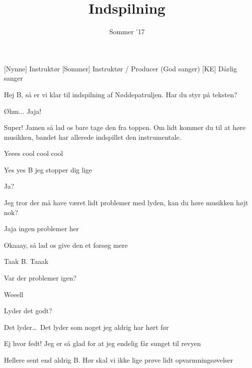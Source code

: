 \documentclass[a4paper,11pt]{article}
\title{Indspilning}
\author{Sommer '17}
\begin{document}
\maketitle

\begin{roles}
[Nynne] Instruktør
[Sommer] Instruktør / Producer (God sanger)
[KE] Dårlig sanger
\end{roles}

\begin{sketch}

 Hej B, så er vi klar til indspilning af Nøddepatruljen. Har du styr på teksten?


 Øhm... Jaja!

 Super! Jamen så lad os bare tage den fra toppen. Om lidt kommer du til at høre musikken, bandet har allerede indspillet den instrumentale.

 Yeees cool cool cool


 Yes yes B jeg stopper dig lige

 Ja?

 Jeg tror der må have været lidt problemer med lyden, kan du høre musikken højt nok?

 Jaja ingen problemer her


 Okaaay, så lad os give den et forsøg mere


 Taak B. Taaak

 Var der problemer igen?

 Weeell

 Lyder det godt?

 Det lyder\ldots\ Det lyder som noget jeg aldrig har hørt før

  Ej hvor fedt! Jeg er så glad for at jeg endelig får sunget til revyen

  Hellere sent end aldrig B. Hør skal vi ikke lige prøve lidt opvarmningsøvelser


\end{sketch}
\end{document}
